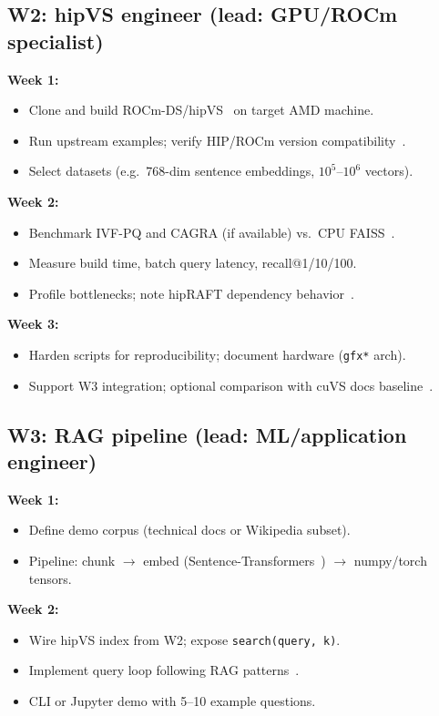 \documentclass[11pt,a4paper]{article}
\begin{document}
\subsection{W2: hipVS engineer (lead: GPU/ROCm specialist)}

\textbf{Week 1:}
\begin{itemize}[leftmargin=*]
  \item Clone and build ROCm-DS/hipVS~\cite{hipvs-github} on target AMD machine.
  \item Run upstream examples; verify HIP/ROCm version compatibility~\cite{hip-faq}.
  \item Select datasets (e.g.\ 768-dim sentence embeddings, $10^5$--$10^6$ vectors).
\end{itemize}

\textbf{Week 2:}
\begin{itemize}[leftmargin=*]
  \item Benchmark IVF-PQ and CAGRA (if available) vs.\ CPU FAISS~\cite{faiss-github}.
  \item Measure build time, batch query latency, recall@1/10/100.
  \item Profile bottlenecks; note hipRAFT dependency behavior~\cite{hipraft-github}.
\end{itemize}

\textbf{Week 3:}
\begin{itemize}[leftmargin=*]
  \item Harden scripts for reproducibility; document hardware (\texttt{gfx*} arch).
  \item Support W3 integration; optional comparison with cuVS docs baseline~\cite{nvidia-cagra}.
\end{itemize}

\subsection{W3: RAG pipeline (lead: ML/application engineer)}

\textbf{Week 1:}
\begin{itemize}[leftmargin=*]
  \item Define demo corpus (technical docs or Wikipedia subset).
  \item Pipeline: chunk $\rightarrow$ embed (Sentence-Transformers~\cite{sentence-transformers})
        $\rightarrow$ numpy/torch tensors.
\end{itemize}

\textbf{Week 2:}
\begin{itemize}[leftmargin=*]
  \item Wire hipVS index from W2; expose \texttt{search(query, k)}.
  \item Implement query loop following RAG patterns~\cite{langchain-rag,rag-lewis2020}.
  \item CLI or Jupyter demo with 5--10 example questions.
\end{itemize}
\end{document}
